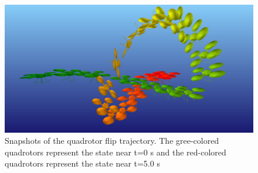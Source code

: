 \documentclass[letterpaper, 10 pt, conference]{ieeeconf}  %
\begin{document}
        \begin{figure}[t]
            \centering
            \includegraphics[width=\columnwidth]{figures/quadflip.png}
            \caption{Snapshots of the quadrotor flip trajectory. The
                gree-colored quadrotors represent the state near t=0 s and the
                red-colored quadrotors represent the state near t=5.0 s
            }
            \label{fig:quad_flip}
        \end{figure}
\end{document}
